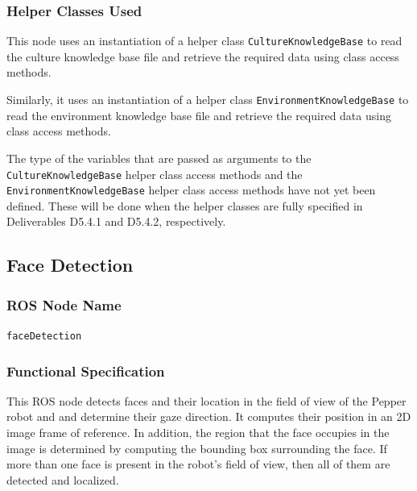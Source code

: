 \documentclass{CSSRforAfrica}
\begin{document}
\subsubsection*{Helper Classes Used}
This node  uses an instantiation of a helper class {\small \verb+CultureKnowledgeBase+}  to read the culture knowledge base file and retrieve the required data using  class access methods. 

Similarly, it uses  an instantiation of a helper class {\small \verb+EnvironmentKnowledgeBase+}  to read the environment knowledge base file and retrieve the required data using  class access methods.  


The type of the variables that are passed as  arguments to the 
{\small \verb+CultureKnowledgeBase+} helper class access methods and the 
{\small \verb+EnvironmentKnowledgeBase+} helper class access methods 
have not yet been defined. 
These will be done when the helper classes are fully specified in Deliverables D5.4.1 and D5.4.2, respectively.


\newpage

\subsection{Face Detection }

\subsubsection*{ROS Node Name}
 {\small \verb+faceDetection+}   

\subsubsection*{Functional Specification}
This ROS node detects faces and their location  in the field of view of the Pepper robot and  and determine their gaze direction. It computes their position in an 2D image frame of reference. In addition, the region that the face occupies in the image is determined by computing the bounding box surrounding the face. If more than one face is present in the robot’s field of view, then all of them are detected and localized.  
\end{document}
